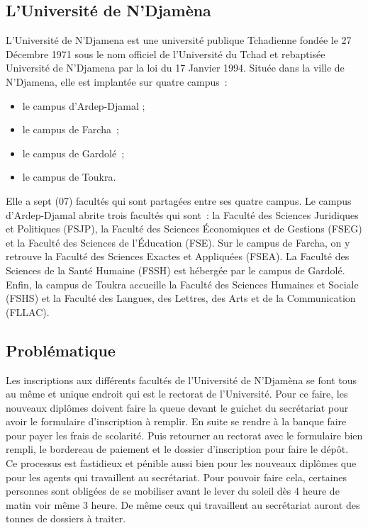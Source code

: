 \documentclass[12pt,a4paper]{article}
\begin{document}
	\subsection{L'Université de N'Djamèna}
	L’Université de N’Djamena est une université publique Tchadienne fondée le 27 Décembre 1971 sous le nom officiel de l’Université du Tchad et rebaptisée Université de N’Djamena par la loi du 17 Janvier 1994. Située dans la ville de N’Djamena, elle est implantée sur quatre campus :
	\begin{itemize}
		\item le campus d’Ardep-Djamal ;
		\item le campus de Farcha ;
		\item le campus de Gardolé ;
		\item le campus de Toukra.
	\end{itemize}
	Elle a sept (07) facultés qui sont partagées entre ses quatre campus. Le campus d’Ardep-Djamal abrite trois facultés qui sont : la Faculté des Sciences Juridiques et Politiques (FSJP), la Faculté des Sciences Économiques et de Gestions (FSEG) et la Faculté des Sciences de l’Éducation (FSE). Sur le campus de Farcha, on y retrouve la Faculté des Sciences Exactes et Appliquées (FSEA). La Faculté des Sciences de la Santé Humaine (FSSH) est hébergée par le campus de Gardolé. Enfin, la campus de Toukra accueille la Faculté des Sciences Humaines et Sociale (FSHS) et la Faculté des Langues, des Lettres, des Arts et de la Communication (FLLAC).
	
	
	\subsection{Problématique}	
	Les inscriptions aux différents facultés de l’Université de N’Djamèna se font tous au même et unique endroit qui est le rectorat de l’Université. Pour ce faire, les nouveaux diplômes doivent faire la queue devant le guichet du secrétariat pour avoir le formulaire d’inscription à remplir. En suite se rendre à la banque faire pour payer les frais de scolarité. Puis retourner au rectorat avec le formulaire bien rempli, le bordereau de paiement et le dossier d’inscription pour faire le dépôt. Ce processus est fastidieux et pénible aussi bien pour les nouveaux diplômes que pour les agents qui travaillent au secrétariat. Pour pouvoir faire cela, certaines personnes sont obligées de se mobiliser avant le lever du soleil dès 4 heure de matin voir même 3 heure. De même ceux qui travaillent au secrétariat auront des tonnes de dossiers à traiter.
	
\end{document}
